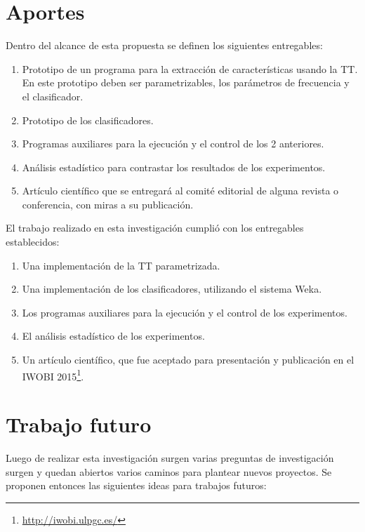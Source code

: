 \section{Aportes}

Dentro del alcance de esta propuesta se definen los siguientes entregables:
\begin{enumerate}
    \item Prototipo de un programa para la extracción de características usando la TT. En este prototipo deben ser parametrizables, los parámetros de frecuencia y el clasificador.
    \item Prototipo de los clasificadores.
    \item Programas auxiliares para la ejecución y el control de los 2 anteriores.
    \item Análisis estadístico para contrastar los resultados de los experimentos.
    \item Artículo científico que se entregará al comité editorial de alguna revista o conferencia, con miras a su publicación.
\end{enumerate}



El trabajo realizado en esta investigación cumplió con los entregables establecidos:
\begin{enumerate}
\item Una implementación de la TT parametrizada.
\item Una implementación de los clasificadores, utilizando el sistema Weka.
\item Los programas auxiliares para la ejecución y el control de los experimentos.
\item El análisis estadístico de los experimentos.
\item Un artículo científico, que fue aceptado para presentación y publicación en el IWOBI 2015\footnote{\url{http://iwobi.ulpgc.es/}}.
\end{enumerate}

\section{Trabajo futuro}
\label{sect:Future work}
Luego de realizar esta investigación surgen varias preguntas de investigación surgen y quedan abiertos varios caminos para plantear nuevos proyectos. Se proponen entonces las siguientes ideas para trabajos futuros:

